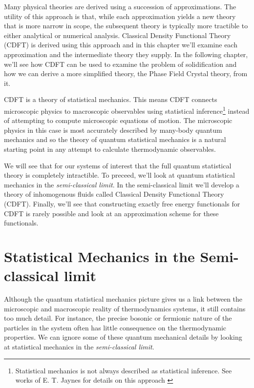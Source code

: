 Many physical theories are derived using a succession of approximations. The
utility of this approach is that, while each approximation yields a new theory
that is more narrow in scope, the subsequent theory is typically more tractible
to either analytical or numerical analysis.  Classical Density Functional
Theory (CDFT) is derived using this approach and in this chapter we'll examine
each approximation and the intermediate theory they supply. In the following
chapter, we'll see how CDFT can be used to examine the problem of
solidification and how we can derive a more simplified theory, the Phase Field
Crystal theory, from it.

CDFT is a theory of statistical mechanics. This means CDFT connects microscopic
physics to macroscopic observables using statistical
inference\footnote{Statistical mechanics is not always described as statistical
inference. See works of E. T. Jaynes for details on this approach
\cite{JAYNES57}} instead of attempting to compute microscopic equations of
motion. The microscopic physics in this case is most accurately described by
many-body quantum mechanics and so the theory of quantum statistical mechanics
is a natural starting point in any attempt to calculate thermodynamic
observables.

We will see that for our systems of interest that the full quantum statistical
theory is completely intractible. To preceed, we'll look at quantum statistical
mechanics in the \textit{semi-classical limit}. In the semi-classical limit
we'll develop a theory of inhomogenous fluids called Classical Density
Functional Theory (CDFT). Finally, we'll see that constructing exactly free
energy functionals for CDFT is rarely possible and look at an approximation
scheme for these functionals.

\section{Statistical Mechanics in the Semi-classical limit} %

Although the quantum statistical mechanics picture gives us a link between the
microscopic and macroscopic reality of thermodynamics systems, it still
contains too much detail.  For instance, the precise bosonic or fermionic
nature of the particles in the system often has little consequence on the
thermodynamic properties.  We can ignore some of these quantum mechanical
details by looking at statistical mechanics in the \textit{semi-classical
limit}.


